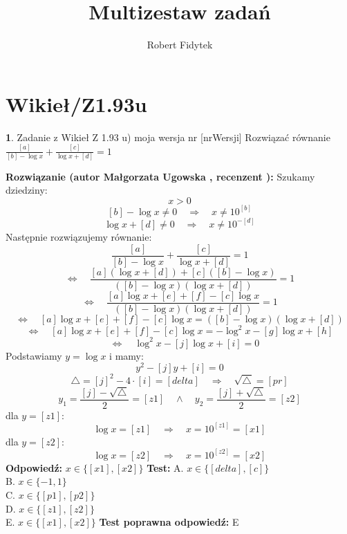 \documentclass[12pt, a4paper]{article}
\title{Multizestaw zadań}
\author{Robert Fidytek}
\date{}
\theoremstyle{definition} %
\newtheorem{zad}{}
\newcommand{\kategoria}[1]{\section{#1}} %
\newcommand{\zadStart}[1]{\begin{zad}#1\newline} %
\newcommand{\zadStop}{\end{zad}}   %
\newcommand{\rozwStart}[2]{\noindent \textbf{Rozwiązanie (autor #1 , recenzent #2): }\newline} %
\newcommand{\rozwStop}{\newline}                                            %
\newcommand{\odpStart}{\noindent \textbf{Odpowiedź:}\newline}    %
\newcommand{\odpStop}{\newline}                                             %
\newcommand{\testStart}{\noindent \textbf{Test:}\newline} %
\newcommand{\testStop}{\newline} %
\newcommand{\kluczStart}{\noindent \textbf{Test poprawna odpowiedź:}\newline} %
\newcommand{\kluczStop}{\newline} %
\begin{document}
\maketitle


\kategoria{Wikieł/Z1.93u}
\zadStart{Zadanie z Wikieł Z 1.93 u) moja wersja nr [nrWersji]}
Rozwiązać równanie $\frac{[a]}{[b]-\log{x}} + \frac{[c]}{\log{x}+[d]} = 1$
\zadStop
\rozwStart{Małgorzata Ugowska}{}
Szukamy dziedziny:
$$x>0$$
$$[b]-\log{x} \ne 0 \quad \Longrightarrow \quad x \ne 10^{[b]}$$ 
$$\log{x} +[d] \ne 0 \quad \Longrightarrow \quad x \ne 10^{-[d]}$$
Następnie rozwiązujemy równanie: 
$$\frac{[a]}{[b]-\log{x}} + \frac{[c]}{\log{x}+[d]} = 1 $$
$$ \Longleftrightarrow \quad \frac{[a](\log{x}+[d]) + [c]([b]-\log{x})}{([b]-\log{x})(\log{x}+[d])} = 1 $$
$$\Longleftrightarrow \quad  \frac{[a]\log{x}+[e] + [f]-[c]\log{x}}{([b]-\log{x})(\log{x}+[d])} = 1 $$
$$ \Longleftrightarrow \quad [a]\log{x}+[e] + [f]-[c]\log{x}= ([b]-\log{x})(\log{x}+[d]) $$
$$ \Longleftrightarrow \quad [a]\log{x}+[e] + [f]-[c]\log{x}= - \log^2{x} -[g]\log{x} + [h]$$
$$ \quad \Longleftrightarrow \quad \log^2{x} - [j]\log{x}+[i]=0 $$
Podstawiamy $y=\log{x}$ i mamy:
$$y^2 -[j]y+[i]=0$$
$$ \bigtriangleup = [j]^2 - 4 \cdot [i] = [delta] \quad  \Longrightarrow \quad \sqrt{\bigtriangleup} = [pr]$$
$$y_1=\frac{[j]-\sqrt{\bigtriangleup}}{2} = [z1] \quad \land \quad y_2=\frac{[j]+\sqrt{\bigtriangleup}}{2} =[z2]$$
dla $y=[z1]$:
$$\log{x} = [z1] \quad  \Longrightarrow \quad x = 10^{[z1]} = [x1]$$
dla $y=[z2]$:
$$\log{x} = [z2] \quad  \Longrightarrow \quad x = 10^{[z2]} = [x2]$$
\rozwStop
\odpStart
$x \in \{[x1], [x2]\}$
\odpStop
\testStart
A. $x \in \{[delta], [c]\}$\\
B. $x \in \{-1, 1\}$\\
C. $x \in \{[p1], [p2]\}$\\
D. $x \in \{[z1], [z2]\}$\\
E. $x \in \{[x1], [x2]\}$
\testStop
\kluczStart
E
\kluczStop
\end{document}

